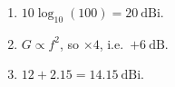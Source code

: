 \begin{enumerate}[leftmargin=1.6em,itemsep=2pt]
\item $10\log_{10}(100) = 20\ \text{dBi}$.
\item $G \propto f^2$, so $\times4$, i.e.\ $+6\ \text{dB}$.
\item $12 + 2.15 = 14.15\ \text{dBi}$.
\end{enumerate}
